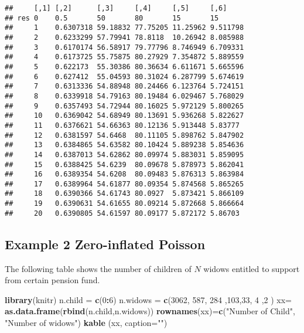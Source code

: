\documentclass[]{article}
\newenvironment{Shaded}{\begin{snugshade}}{\end{snugshade}}
\newcommand{\DataTypeTok}[1]{\textcolor[rgb]{0.13,0.29,0.53}{#1}}
\newcommand{\DecValTok}[1]{\textcolor[rgb]{0.00,0.00,0.81}{#1}}
\newcommand{\KeywordTok}[1]{\textcolor[rgb]{0.13,0.29,0.53}{\textbf{#1}}}
\newcommand{\NormalTok}[1]{#1}
\newcommand{\OperatorTok}[1]{\textcolor[rgb]{0.81,0.36,0.00}{\textbf{#1}}}
\newcommand{\StringTok}[1]{\textcolor[rgb]{0.31,0.60,0.02}{#1}}
\begin{document}
\begin{verbatim}
##     [,1] [,2]      [,3]     [,4]     [,5]     [,6]    
## res 0    0.5       50       80       15       15      
##     1    0.6307318 59.18832 77.75205 11.25962 9.511798
##     2    0.6233299 57.79941 78.8118  10.26942 8.085988
##     3    0.6170174 56.58917 79.77796 8.746949 6.709331
##     4    0.6173725 55.75875 80.27929 7.354872 5.889559
##     5    0.622173  55.30386 80.36634 6.611671 5.665596
##     6    0.627412  55.04593 80.31024 6.287799 5.674619
##     7    0.6313336 54.88948 80.24466 6.123764 5.724151
##     8    0.6339918 54.79163 80.19484 6.029467 5.768029
##     9    0.6357493 54.72944 80.16025 5.972129 5.800265
##     10   0.6369042 54.68949 80.13691 5.936268 5.822627
##     11   0.6376621 54.66363 80.12136 5.913448 5.83777 
##     12   0.6381597 54.6468  80.11105 5.898762 5.847902
##     13   0.6384865 54.63582 80.10424 5.889238 5.854636
##     14   0.6387013 54.62862 80.09974 5.883031 5.859095
##     15   0.6388425 54.6239  80.09678 5.878973 5.862041
##     16   0.6389354 54.6208  80.09483 5.876313 5.863984
##     17   0.6389964 54.61877 80.09354 5.874568 5.865265
##     18   0.6390366 54.61743 80.0927  5.873421 5.866109
##     19   0.6390631 54.61655 80.09214 5.872668 5.866664
##     20   0.6390805 54.61597 80.09177 5.872172 5.86703
\end{verbatim}

\hypertarget{example-2-zero-inflated-poisson}{%
\subsection{Example 2 Zero-inflated
Poisson}\label{example-2-zero-inflated-poisson}}

The following table shows the number of children of \(N\) widows
entitled to support from certain pension fund.

\begin{Shaded}
\begin{Highlighting}[]
\KeywordTok{library}\NormalTok{(knitr)}
\NormalTok{n.child =}\StringTok{ }\KeywordTok{c}\NormalTok{(}\DecValTok{0}\OperatorTok{:}\DecValTok{6}\NormalTok{)}
\NormalTok{n.widows =}\StringTok{ }\KeywordTok{c}\NormalTok{(}\DecValTok{3062}\NormalTok{, }\DecValTok{587}\NormalTok{, }\DecValTok{284}\NormalTok{ ,}\DecValTok{103}\NormalTok{,}\DecValTok{33}\NormalTok{, }\DecValTok{4}\NormalTok{ ,}\DecValTok{2}\NormalTok{ )}
\NormalTok{xx=}\StringTok{ }\KeywordTok{as.data.frame}\NormalTok{(}\KeywordTok{rbind}\NormalTok{(n.child,n.widows))}
\KeywordTok{rownames}\NormalTok{(xx)=}\KeywordTok{c}\NormalTok{(}\StringTok{"Number of Child"}\NormalTok{, }\StringTok{"Number of widows"}\NormalTok{)}
\KeywordTok{kable}\NormalTok{ (xx, }\DataTypeTok{caption=}\StringTok{""}\NormalTok{)  }
\end{Highlighting}
\end{Shaded}
\end{document}
